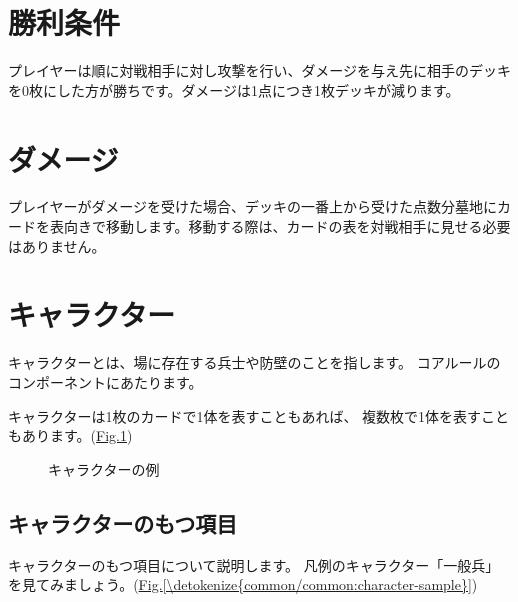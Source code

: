 \documentclass[letterpaper,10pt,dvipdfmx]{sphinxmanual}
\begin{document}
\section{勝利条件}
\label{\detokenize{common/common:id7}}
\sphinxAtStartPar
プレイヤーは順に対戦相手に対し攻撃を行い、ダメージを与え先に相手のデッキを0枚にした方が勝ちです。ダメージは1点につき1枚デッキが減ります。


\section{ダメージ}
\label{\detokenize{common/common:id8}}
\sphinxAtStartPar
プレイヤーがダメージを受けた場合、デッキの一番上から受けた点数分墓地にカードを表向きで移動します。移動する際は、カードの表を対戦相手に見せる必要はありません。


\section{キャラクター}
\label{\detokenize{common/common:id9}}
\sphinxAtStartPar
キャラクターとは、場に存在する兵士や防壁のことを指します。
コアルールのコンポーネントにあたります。

\sphinxAtStartPar
キャラクターは1枚のカードで1体を表すこともあれば、
複数枚で1体を表すこともあります。(\hyperref[\detokenize{common/common:character}]{Fig.\@ \ref{\detokenize{common/common:character}}})

\begin{figure}[htbp]
\centering
\capstart

\noindent{}
\caption{キャラクターの例}\label{\detokenize{common/common:id50}}\label{\detokenize{common/common:character}}\end{figure}


\subsection{キャラクターのもつ項目}
\label{\detokenize{common/common:id10}}
\sphinxAtStartPar
キャラクターのもつ項目について説明します。
凡例のキャラクター「一般兵」を見てみましょう。(\hyperref[\detokenize{common/common:character-sample}]{Fig.\@ \ref{\detokenize{common/common:character-sample}}})
\end{document}
